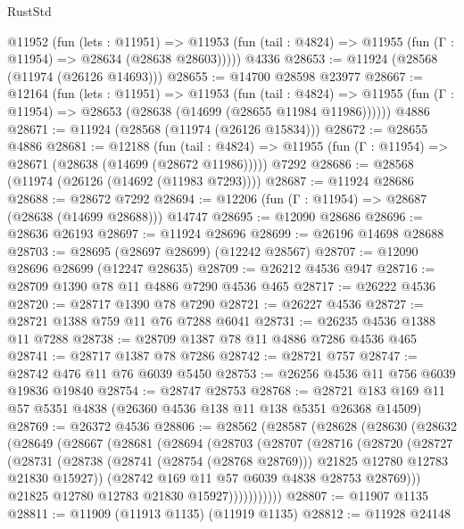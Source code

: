 \begin{lexlean}{RustStd}
\begin{coremodule}
    @11952
      (fun (lets : @11951) =>
      @11953 (fun (tail : @4824) => @11955 (fun (Γ : @11954) => @28634 (@28638 @28603)))))
    @4336
@28653 := @11924 (@28568 (@11974 (@26126 @14693)))
@28655 := @14700 @28598 @23977
@28667 := @12164
    (fun (lets : @11951) =>
    @11953
      (fun (tail : @4824) =>
      @11955 (fun (Γ : @11954) => @28653 (@28638 (@14699 (@28655 @11984 @11986))))))
    @4886
@28671 := @11924 (@28568 (@11974 (@26126 @15834)))
@28672 := @28655 @4886
@28681 := @12188
    (fun (tail : @4824) => @11955 (fun (Γ : @11954) => @28671 (@28638 (@14699 (@28672 @11986)))))
    @7292
@28686 := @28568 (@11974 (@26126 (@14692 (@11983 @7293))))
@28687 := @11924 @28686
@28688 := @28672 @7292
@28694 := @12206 (fun (Γ : @11954) => @28687 (@28638 (@14699 @28688))) @14747
@28695 := @12090 @28686
@28696 := @28636 @26193
@28697 := @11924 @28696
@28699 := @26196 @14698 @28688
@28703 := @28695 (@28697 @28699) (@12242 @28567)
@28707 := @12090 @28696 @28699 (@12247 @28635)
@28709 := @26212 @4536 @947
@28716 := @28709 @1390 @78 @11 @4886 @7290 @4536 @465
@28717 := @26222 @4536
@28720 := @28717 @1390 @78 @7290
@28721 := @26227 @4536
@28727 := @28721 @1388 @759 @11 @76 @7288 @6041
@28731 := @26235 @4536 @1388 @11 @7288
@28738 := @28709 @1387 @78 @11 @4886 @7286 @4536 @465
@28741 := @28717 @1387 @78 @7286
@28742 := @28721 @757
@28747 := @28742 @476 @11 @76 @6039 @5450
@28753 := @26256 @4536 @11 @756 @6039 @19836 @19840
@28754 := @28747 @28753
@28768 := @28721 @183 @169 @11 @57 @5351 @4838 (@26360 @4536 @138 @11 @138 @5351 @26368 @14509)
@28769 := @26372 @4536
@28806 := @28562
    (@28587
      (@28628
        (@28630
          (@28632
            (@28649
              (@28667
                (@28681
                  (@28694
                    (@28703
                      (@28707
                        (@28716
                          (@28720
                            (@28727
                              (@28731
                                (@28738
                                  (@28741 (@28754 (@28768 @28769)))
                                  @21825
                                  @12780
                                  @12783
                                  @21830
                                  @15927))
                              (@28742 @169 @11 @57 @6039 @4838 @28753 @28769)))
                          @21825
                          @12780
                          @12783
                          @21830
                          @15927)))))))))))
@28807 := @11907 @1135
@28811 := @11909 (@11913 @1135) (@11919 @1135)
@28812 := @11928 @24148

\end{coremodule}
\end{lexlean}
